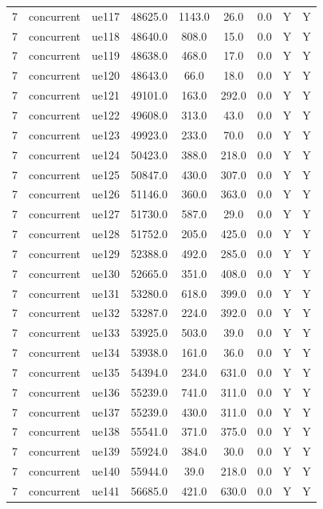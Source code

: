 \begin{table}[ht]
\begin{tabular}{|c|c|c|c|c|c|c|c|c|}
7 & concurrent & ue117 & 48625.0 & 1143.0 & 26.0 & 0.0 & Y & Y \\
7 & concurrent & ue118 & 48640.0 & 808.0 & 15.0 & 0.0 & Y & Y \\
7 & concurrent & ue119 & 48638.0 & 468.0 & 17.0 & 0.0 & Y & Y \\
7 & concurrent & ue120 & 48643.0 & 66.0 & 18.0 & 0.0 & Y & Y \\
7 & concurrent & ue121 & 49101.0 & 163.0 & 292.0 & 0.0 & Y & Y \\
7 & concurrent & ue122 & 49608.0 & 313.0 & 43.0 & 0.0 & Y & Y \\
7 & concurrent & ue123 & 49923.0 & 233.0 & 70.0 & 0.0 & Y & Y \\
7 & concurrent & ue124 & 50423.0 & 388.0 & 218.0 & 0.0 & Y & Y \\
7 & concurrent & ue125 & 50847.0 & 430.0 & 307.0 & 0.0 & Y & Y \\
7 & concurrent & ue126 & 51146.0 & 360.0 & 363.0 & 0.0 & Y & Y \\
7 & concurrent & ue127 & 51730.0 & 587.0 & 29.0 & 0.0 & Y & Y \\
7 & concurrent & ue128 & 51752.0 & 205.0 & 425.0 & 0.0 & Y & Y \\
7 & concurrent & ue129 & 52388.0 & 492.0 & 285.0 & 0.0 & Y & Y \\
7 & concurrent & ue130 & 52665.0 & 351.0 & 408.0 & 0.0 & Y & Y \\
7 & concurrent & ue131 & 53280.0 & 618.0 & 399.0 & 0.0 & Y & Y \\
7 & concurrent & ue132 & 53287.0 & 224.0 & 392.0 & 0.0 & Y & Y \\
7 & concurrent & ue133 & 53925.0 & 503.0 & 39.0 & 0.0 & Y & Y \\
7 & concurrent & ue134 & 53938.0 & 161.0 & 36.0 & 0.0 & Y & Y \\
7 & concurrent & ue135 & 54394.0 & 234.0 & 631.0 & 0.0 & Y & Y \\
7 & concurrent & ue136 & 55239.0 & 741.0 & 311.0 & 0.0 & Y & Y \\
7 & concurrent & ue137 & 55239.0 & 430.0 & 311.0 & 0.0 & Y & Y \\
7 & concurrent & ue138 & 55541.0 & 371.0 & 375.0 & 0.0 & Y & Y \\
7 & concurrent & ue139 & 55924.0 & 384.0 & 30.0 & 0.0 & Y & Y \\
7 & concurrent & ue140 & 55944.0 & 39.0 & 218.0 & 0.0 & Y & Y \\
7 & concurrent & ue141 & 56685.0 & 421.0 & 630.0 & 0.0 & Y & Y \\

\end{tabular}
\end{table}
